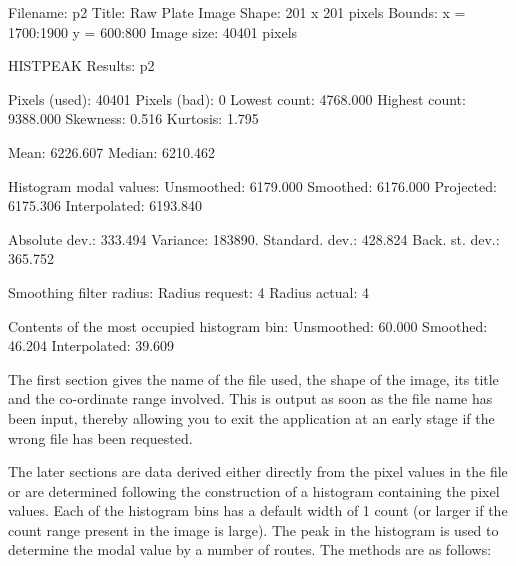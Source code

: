 \documentclass[twoside,11pt]{starlink}
\begin{document}
\begin{terminalv}
Filename:   p2
Title:      Raw Plate Image
Shape:      201 x 201  pixels
Bounds:     x = 1700:1900  y = 600:800
Image size: 40401 pixels

HISTPEAK Results: p2

Pixels (used):              40401     Pixels (bad):                0
Lowest count:            4768.000     Highest count:        9388.000
Skewness:                   0.516     Kurtosis:                1.795

Mean:                    6226.607     Median:               6210.462

Histogram modal values:
Unsmoothed:              6179.000     Smoothed:             6176.000
Projected:               6175.306     Interpolated:         6193.840

Absolute dev.:            333.494     Variance:              183890.
Standard. dev.:           428.824     Back. st. dev.:        365.752

Smoothing filter radius:
Radius request:                 4     Radius actual:               4

Contents of the most occupied histogram bin:
Unsmoothed:                60.000     Smoothed:               46.204
Interpolated:              39.609
\end{terminalv}

The first section gives the name of the file used, the shape of the image,
its title and the co-ordinate range involved. This is output as soon as
the file name has been input, thereby allowing you to exit the application
at an early stage if the wrong file has been requested.

The later sections are data derived either directly from the pixel values
in the file or are determined following the construction of a histogram
containing the pixel values. Each of the histogram bins has a default
width of 1 count (or larger if the count range present in the image is large).
The peak in the histogram is used to determine the modal
value by a number of routes. The methods are as follows:
\end{document}
